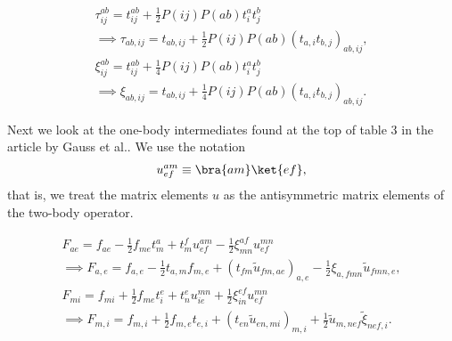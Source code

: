         \begin{gather}
            \tau^{ab}_{ij} = t^{ab}_{ij}
            + \frac{1}{2}P(ij)P(ab)t^{a}_{i} t^{b}_{j}
            \\
            \implies \tau_{ab, ij} = t_{ab, ij}
            + \frac{1}{2}P(ij)P(ab)\left(t_{a, i} t_{b, j}\right)_{ab, ij},
            \\
            \xi^{ab}_{ij} = t^{ab}_{ij}
            + \frac{1}{4}P(ij)P(ab)t^{a}_{i}t^{b}_{j}
            \\
            \implies
            \xi_{ab, ij} = t_{ab, ij}
            + \frac{1}{4}P(ij)P(ab)\left(t_{a, i} t_{b, j}\right)_{ab, ij}.
        \end{gather}

        Next we look at the one-body intermediates found at the top of table 3
        in the article by Gauss et al.\cite{gauss1995coupled}. We use the
        notation
        \begin{align}
            u^{am}_{ef} \equiv \bra{am}\ket{ef},
        \end{align}
        that is, we treat the matrix elements $u$ as the antisymmetric matrix
        elements of the two-body operator.

        \begin{gather}
            F_{ae} = f_{ae}
            - \frac{1}{2}f_{me}t^{a}_{m}
            + t^{f}_{m}u^{am}_{ef}
            - \frac{1}{2}\xi^{af}_{mn}u^{mn}_{ef}
            \\
            \implies
            F_{a, e} = f_{a, e}
            - \frac{1}{2}t_{a, m}f_{m, e}
            + \left(t_{fm}\tilde{u}_{fm, ae}\right)_{a, e}
            - \frac{1}{2}\xi_{a, fmn}\tilde{u}_{fmn, e},
            \\
            F_{mi} = f_{mi} + \frac{1}{2}f_{me}t^{e}_{i}
            + t^{e}_{n}u^{mn}_{ie}
            + \frac{1}{2}\xi^{ef}_{in}u^{mn}_{ef}
            \\
            \implies
            F_{m, i} = f_{m, i}
            + \frac{1}{2}f_{m, e} t_{e, i}
            + \left(t_{en}\tilde{u}_{en, mi}\right)_{m, i}
            + \frac{1}{2}\tilde{u}_{m, nef}\tilde{\xi}_{nef, i}.
        \end{gather}
